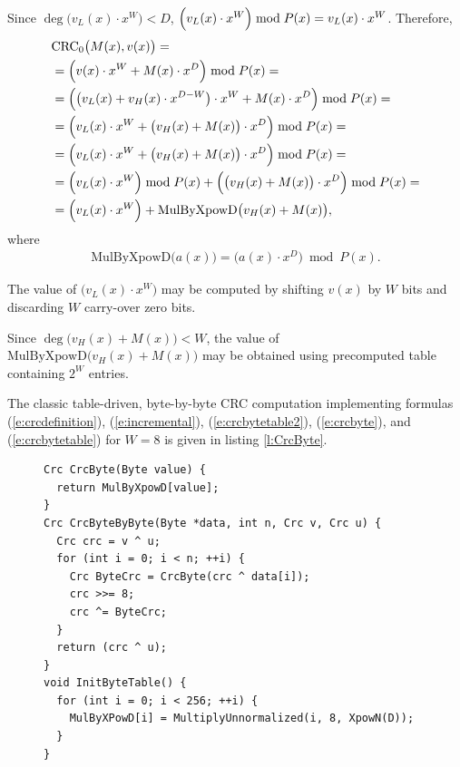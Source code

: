 \documentclass{article}
\begin{document}
Since $\deg\bigl(v_L(x) \cdot x^W \bigr) < D$, $\Bigl(v_L(x) \cdot
x^W\Bigr) \bmod P(x) = v_L(x) \cdot x^W$. Therefore,
  \begin{align}
    & {\rm CRC}_0\bigl(M(x), v(x)\bigr) = \nonumber \\
      &= \Bigl(v(x) \cdot x^W + M(x) \cdot x^D\Bigr) \bmod P(x) = \nonumber \\
      &= \Bigl(\bigl(v_L(x) + v_H(x) \cdot x^{D-W}\bigr)\cdot x^W + M(x) \cdot x^D\Bigr) \bmod P(x) = \nonumber \\
      &= \Bigl(v_L(x) \cdot x^W + \bigl(v_H(x) + M(x)\bigr) \cdot x^D\Bigr) \bmod P(x) = \nonumber \\
      &= \Bigl(v_L(x) \cdot x^W + \bigl(v_H(x) + M(x)\bigr) \cdot x^D\Bigr) \bmod P(x) = \nonumber \\
      &= \Bigl(v_L(x) \cdot x^W\Bigr) \bmod P(x) + \Bigl(\bigl(v_H(x) + M(x)\bigr) \cdot x^D \Bigr) \bmod P(x) = \nonumber \\
      &= \Bigl(v_L(x) \cdot x^W\Bigr) + \mbox{MulByXpowD}\bigl(v_H(x) + M(x)\bigr), \label{e:crcbyte}
  \end{align}
where
  \begin{align}
    \mbox{MulByXpowD}\bigl(a(x)\bigr) = \bigl(a(x) \cdot x^D \bigr) \bmod P(x). \label{e:crcbytetable}
  \end{align}

The value of $\bigl(v_L(x) \cdot x^W\bigr)$ may be computed by shifting
$v(x)$ by $W$ bits and discarding $W$ carry-over zero bits.

Since $\deg\bigl(v_H(x) + M(x)\bigr) < W$, the value of
$\mbox{MulByXpowD}\bigl(v_H(x) + M(x)\bigr)$ may be obtained using
precomputed table containing $2^W$ entries.

The classic table-driven, byte-by-byte CRC computation \cite{Perez83,
DBLP:journals/cacm/Sarwate88} implementing formulas
(\ref{e:crcdefinition}), (\ref{e:incremental}), (\ref{e:crcbytetable2}),
(\ref{e:crcbyte}), and (\ref{e:crcbytetable}) for $W=8$ is given in listing
\ref{l:CrcByte}.

\begin{figure}
\begin{lstlisting}[caption={Computing CRC byte by byte},label={l:CrcByte}]
Crc CrcByte(Byte value) {
  return MulByXpowD[value];
}
Crc CrcByteByByte(Byte *data, int n, Crc v, Crc u) {
  Crc crc = v ^ u;
  for (int i = 0; i < n; ++i) {
    Crc ByteCrc = CrcByte(crc ^ data[i]);
    crc >>= 8;
    crc ^= ByteCrc;
  }
  return (crc ^ u);
}
void InitByteTable() {
  for (int i = 0; i < 256; ++i) {
    MulByXPowD[i] = MultiplyUnnormalized(i, 8, XpowN(D));
  }
}
\end{lstlisting}
\end{figure}
\end{document}
